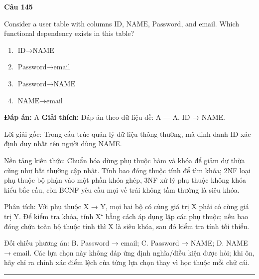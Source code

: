 \documentclass[11pt,a4paper]{article}
\newenvironment{question}[1]{%
  \par\vspace{1em}\noindent\textbf{\large Câu #1}\par\vspace{0.4em}
}{%
  \par\vspace{1em}\hrule\vspace{0.6em}
}
\newenvironment{choices}{%
  \begin{enumerate}[label=\textbf{\Alph*.},leftmargin=2.2em,itemsep=2pt,topsep=3pt]
}{%
  \end{enumerate}
}
\newcommand{\choice}{\item}
\begin{document}
\begin{question}{145}
Consider a user table with columns \(\text{ID}\), \(\text{NAME}\), \(\text{Password}\), and \(\text{email}\). Which functional dependency exists in this table?
\begin{choices}
\choice \(\text{ID} \rightarrow \text{NAME}\)
\choice \(\text{Password} \rightarrow \text{email}\)
\choice \(\text{Password} \rightarrow \text{NAME}\)
\choice \(\text{NAME} \rightarrow \text{email}\)
\end{choices}
\textbf{Đáp án:} A
\textbf{Giải thích:} Đáp án theo dữ liệu đề: A — A. ID → NAME.

Lời giải gốc: Trong cấu trúc quản lý dữ liệu thông thường, mã định danh ID xác định duy nhất tên người dùng NAME.

Nền tảng kiến thức: Chuẩn hóa dùng phụ thuộc hàm và khóa để giảm dư thừa cũng như bất thường cập nhật. Tính bao đóng thuộc tính để tìm khóa; 2NF loại phụ thuộc bộ phận vào một phần khóa ghép, 3NF xử lý phụ thuộc không khóa kiểu bắc cầu, còn BCNF yêu cầu mọi vế trái không tầm thường là siêu khóa.

Phân tích: Với phụ thuộc X → Y, mọi hai bộ có cùng giá trị X phải có cùng giá trị Y. Để kiểm tra khóa, tính X⁺ bằng cách áp dụng lặp các phụ thuộc; nếu bao đóng chứa toàn bộ thuộc tính thì X là siêu khóa, sau đó kiểm tra tính tối thiểu.

Đối chiếu phương án: B. Password → email; C. Password → NAME; D. NAME → email. Các lựa chọn này không đáp ứng định nghĩa/điều kiện được hỏi; khi ôn, hãy chỉ ra chính xác điểm lệch của từng lựa chọn thay vì học thuộc mỗi chữ cái.
\end{question}
\end{document}
